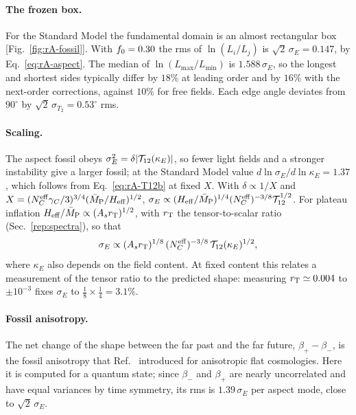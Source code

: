 \paragraph{The frozen box.}
For the Standard Model the fundamental domain is an almost rectangular box [Fig.~\ref{fig:rA-fossil}].
With $f_0=0.30$ the rms of $\ln(L_i/L_j)$ is $\sqrt2\,\sigma_E=0.147$, by Eq.~\eqref{eq:rA-aspect}. %
The median of $\ln(L_{\max}/L_{\min})$ is $1.588\,\sigma_E$, so the longest and shortest sides typically differ by $18\%$ at leading order and by $16\%$ with the next-order corrections, against $10\%$ for free fields. %
Each edge angle deviates from $90^\circ$ by $\sqrt2\,\sigma_{T_2}=0.53^\circ$ rms. %

\paragraph{Scaling.}
The aspect fossil obeys $\sigma_E^2=\delta|\mathcal{T}_{12}(\kappa_E)|$, so fewer light fields and a stronger instability give a larger fossil; at the Standard Model value $d\ln\sigma_E/d\ln\kappa_E=1.37$, which follows from Eq.~\eqref{eq:rA-T12b} at fixed $X$. %
With $\delta\propto1/X$ and $X=(N_C^{\mathrm{eff}}\gamma_C/3)^{3/4}(\bar M_{\mathrm{P}}/H_{\mathrm{eff}})^{1/2}$, $\sigma_E\propto(H_{\mathrm{eff}}/\bar M_{\mathrm{P}})^{1/4}(N_C^{\mathrm{eff}})^{-3/8}\mathcal{T}_{12}^{1/2}$.
For plateau inflation $H_{\mathrm{eff}}/\bar M_{\mathrm{P}}\propto(A_sr_{\mathrm{T}})^{1/2}$, with $r_{\mathrm{T}}$ the tensor-to-scalar ratio (Sec.~\ref{rep:spectra}), so that
\begin{equation}
\sigma_E\propto(A_sr_{\mathrm{T}})^{1/8}\,(N_C^{\mathrm{eff}})^{-3/8}\,\mathcal{T}_{12}(\kappa_E)^{1/2},
\label{eq:rA-scaling}
\end{equation}
where $\kappa_E$ also depends on the field content.
At fixed content this relates a measurement of the tensor ratio to the predicted shape: measuring $r_{\mathrm{T}}\simeq0.004$ to $\pm10^{-3}$ fixes $\sigma_E$ to $\tfrac18\times\tfrac14=3.1\%$. %

\paragraph{Fossil anisotropy.}
The net change of the shape between the far past and the far future, $\beta_+-\beta_-$, is the fossil anisotropy that Ref.~\cite{Zhou:2026szo} introduced for anisotropic flat cosmologies.
Here it is computed for a quantum state; since $\beta_-$ and $\beta_+$ are nearly uncorrelated and have equal variances by time symmetry, its rms is $1.39\,\sigma_E$ per aspect mode, close to $\sqrt2\,\sigma_E$. %

